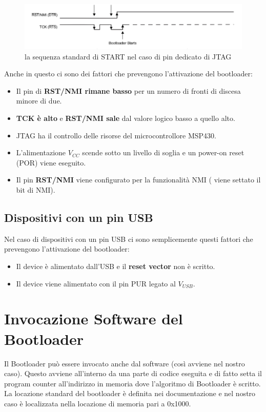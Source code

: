 \documentclass[LaM,binding=0.6cm,oneside]{../sapthesis}
\begin{document}
\begin{figure}[htbp]
\centerline{\includegraphics[scale=0.47]{examples/JTAGPin.png}}
\caption{la sequenza standard di START nel caso di pin dedicato di JTAG}
\label{fig}
\end{figure}

Anche in questo ci sono dei fattori che prevengono l’attivazione del bootloader:
\begin{itemize}
\item Il pin di \textbf{RST/NMI rimane basso} per un numero di fronti di discesa minore di due.
\item \textbf{TCK è alto} e \textbf{RST/NMI sale} dal valore logico basso a quello alto.
\item JTAG ha il controllo delle risorse del microcontrollore MSP430.
\item L’alimentazione $V_{CC}$ scende sotto un livello di soglia e un power-on reset (POR) viene eseguito.
\item Il pin \textbf{RST/NMI} viene configurato per la funzionalità NMI ( viene settato il bit di NMI).
\end{itemize}


\subsection{Dispositivi con un pin USB}

Nel caso di dispositivi con un pin USB ci sono semplicemente questi fattori che prevengono l’attivazione del bootloader:
\begin{itemize}
\item Il device è alimentato dall’USB e il \textbf{reset vector} non è scritto.
\item Il device viene alimentato con il pin PUR legato al \textbf{$V_{USB}$}.

\end{itemize}

\section{Invocazione Software del Bootloader}

Il Bootloader può essere invocato anche dal software (così avviene nel nostro caso).
Questo avviene all’interno da una parte di codice eseguita e di fatto setta il program counter all’indirizzo in memoria dove l’algoritmo di Bootloader è scritto. La locazione standard del bootloader è definita nei documentazione e nel nostro caso è localizzata nella locazione di memoria pari a 0x1000.
\end{document}
